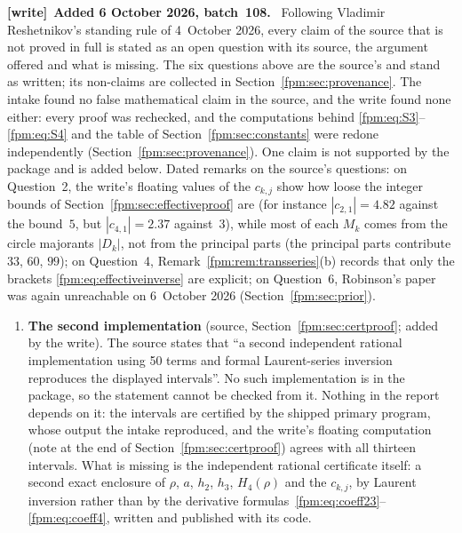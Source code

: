 \documentclass[11pt]{article}
\theoremstyle{definition}\newtheorem{definition}[theorem]{Definition}
\theoremstyle{remark}\newtheorem{remark}[theorem]{Remark}
\newenvironment{writenote}[1][]{\par\smallskip\begingroup\small
 \noindent\textbf{[write]}\if\relax\detokenize{#1}\relax\else~\textbf{#1.}\fi\ }%
 {\par\endgroup\smallskip}
\begin{document}
\begin{writenote}[Added 6 October 2026, batch~108]
Following Vladimir Reshetnikov's standing rule of 4~October 2026, every claim
of the source that is not proved in full is stated as an open question with
its source, the argument offered and what is missing. The six questions
above are the source's and stand as written; its non-claims are collected
in Section~\ref{fpm:sec:provenance}. The intake found no false mathematical
claim in the source, and the write found none either: every proof was
rechecked, and the computations behind
\eqref{fpm:eq:S3}--\eqref{fpm:eq:S4} and the table of
Section~\ref{fpm:sec:constants} were redone independently (Section~\ref{fpm:sec:provenance}).
One claim is not supported by the package and is added below. Dated
remarks on the source's questions: on Question~2, the write's floating
values of the $c_{k,j}$ show how loose the integer bounds of
Section~\ref{fpm:sec:effectiveproof} are (for instance $|c_{2,1}|=4.82$
against the bound~$5$, but $|c_{4,1}|=2.37$ against~$3$), while most of each
$M_k$ comes from the circle majorants $|D_k|$, not from the principal
parts (the principal parts contribute $33$, $60$, $99$); on Question~4,
Remark~\ref{fpm:rem:transseries}(b) records that only the brackets
\eqref{fpm:eq:effectiveinverse} are explicit; on Question~6, Robinson's
paper was again unreachable on 6~October 2026 (Section~\ref{fpm:sec:prior}).
\end{writenote}
\begin{enumerate}[start=7]
\item\label{fpm:q:second} \textbf{The second implementation} (source,
 Section~\ref{fpm:sec:certproof}; added by the write). The source states that
 ``a second independent rational implementation using 50 terms and formal
 Laurent-series inversion reproduces the displayed intervals''. No such
 implementation is in the package, so the statement cannot be checked from
 it. Nothing in the report depends on it: the intervals are certified by the
 shipped primary program, whose output the intake reproduced, and the write's
 floating computation (note at the end of Section~\ref{fpm:sec:certproof})
 agrees with all thirteen intervals. What is missing is the independent
 rational certificate itself: a second exact enclosure of $\rho$, $a$,
 $h_2$, $h_3$, $H_4(\rho)$ and the $c_{k,j}$, by Laurent inversion rather
 than by the derivative formulas~\eqref{fpm:eq:coeff23}--\eqref{fpm:eq:coeff4},
 written and published with its code.
\end{enumerate}
\end{document}
